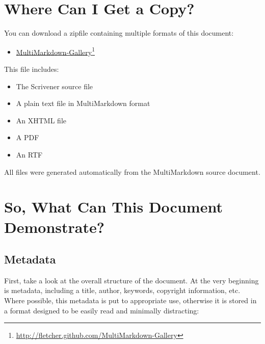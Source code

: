 \chapter{Where Can I Get a Copy?}
\label{wherecanigetacopy}

You can download a zipfile containing multiple formats of this document:

\begin{itemize}
\item \href{http://fletcher.github.com/MultiMarkdown-Gallery}{MultiMarkdown-Gallery}\footnote{\href{http://fletcher.github.com/MultiMarkdown-Gallery}{http:/\slash fletcher.github.com\slash MultiMarkdown-Gallery}}

\end{itemize}

This file includes:

\begin{itemize}
\item The Scrivener source file

\item A plain text file in MultiMarkdown format

\item An XHTML file

\item A PDF

\item An RTF

\end{itemize}

All files were generated automatically from the MultiMarkdown source document.

\chapter{So, What Can This Document Demonstrate?}
\label{sowhatcanthisdocumentdemonstrate}

\section{Metadata}
\label{metadata}

First, take a look at the overall structure of the document. At the very
beginning is metadata, including a title, author, keywords, copyright
information, etc. Where possible, this metadata is put to appropriate use,
otherwise it is stored in a format designed to be easily read and minimally
distracting:

